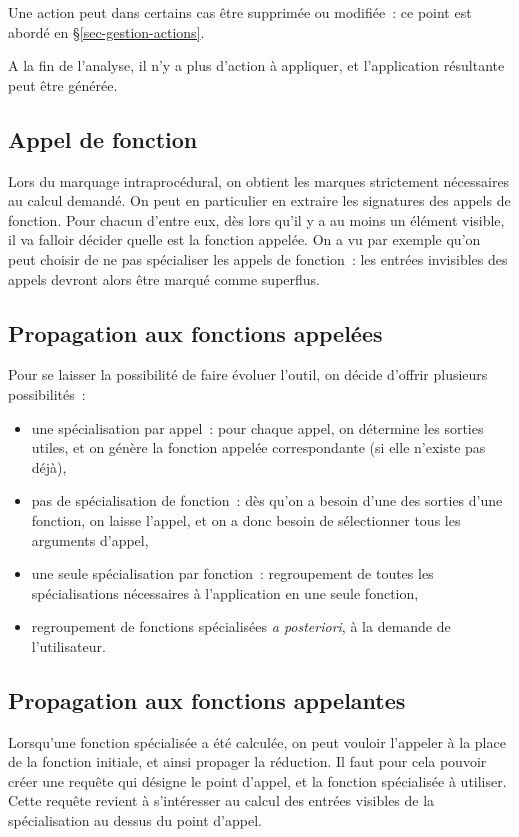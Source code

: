 Une action peut dans certains cas être supprimée ou modifiée~: 
ce point est abordé en \S\ref{sec-gestion-actions}.
\bb

A la fin de l'analyse, il n'y a plus d'action à appliquer,
et l'application résultante peut être générée.

\subsection{Appel de fonction}

Lors du marquage intraprocédural, on obtient les marques strictement nécessaires
au calcul demandé. On peut en particulier en extraire les signatures des appels
de fonction. Pour chacun d'entre eux, dès lors qu'il y a au moins un élément
visible, il va falloir décider quelle est la fonction appelée.
On a vu par exemple qu'on peut choisir de ne pas spécialiser les appels de
fonction~: les entrées invisibles des appels devront alors être marqué comme
superflus.

\subsection{Propagation aux fonctions appelées}\label{sec-callee}

Pour se laisser la possibilité de faire évoluer l'outil,
  on décide d'offrir plusieurs possibilités~:
\begin{itemize}
\item une spécialisation par appel~: 
pour chaque appel, on détermine les sorties
utiles, et on génère la fonction appelée correspondante (si elle n'existe pas
déjà),
\item pas de spécialisation de fonction~: dès qu'on a besoin d'une des sorties
d'une fonction, on laisse l'appel, et on a donc besoin de sélectionner tous les
arguments d'appel,
\item une seule spécialisation par fonction~: regroupement de toutes les 
spécialisations nécessaires à l'application en une seule fonction,
\item regroupement de fonctions spécialisées {\it a posteriori}, 
à la demande de l'utilisateur.
\end{itemize}

\subsection{Propagation aux fonctions appelantes}\label{sec-caller}

  Lorsqu'une fonction spécialisée a été calculée, on peut vouloir l'appeler
  à la place de la fonction initiale, et ainsi propager la réduction.
  Il faut pour cela pouvoir créer une requête qui désigne le point d'appel,
  et la fonction spécialisée à utiliser. Cette requête revient à s'intéresser au
  calcul des entrées visibles de la spécialisation au dessus du point d'appel.
  
